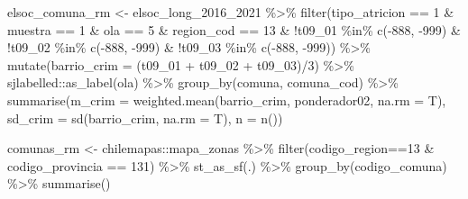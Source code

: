 \documentclass[
  12pt,
]{book}
\newenvironment{Shaded}{\begin{snugshade}}{\end{snugshade}}
\newcommand{\AttributeTok}[1]{\textcolor[rgb]{0.77,0.63,0.00}{#1}}
\newcommand{\DecValTok}[1]{\textcolor[rgb]{0.00,0.00,0.81}{#1}}
\newcommand{\FunctionTok}[1]{\textcolor[rgb]{0.00,0.00,0.00}{#1}}
\newcommand{\NormalTok}[1]{#1}
\newcommand{\OtherTok}[1]{\textcolor[rgb]{0.56,0.35,0.01}{#1}}
\newcommand{\SpecialCharTok}[1]{\textcolor[rgb]{0.00,0.00,0.00}{#1}}
\newcommand{\StringTok}[1]{\textcolor[rgb]{0.31,0.60,0.02}{#1}}
\begin{document}
\begin{Shaded}
\begin{Highlighting}[]
\NormalTok{elsoc\_comuna\_rm }\OtherTok{\textless{}{-}}\NormalTok{ elsoc\_long\_2016\_2021 }\SpecialCharTok{\%\textgreater{}\%} 
  \FunctionTok{filter}\NormalTok{(tipo\_atricion }\SpecialCharTok{==} \DecValTok{1} \SpecialCharTok{\&}\NormalTok{ muestra }\SpecialCharTok{==} \DecValTok{1} \SpecialCharTok{\&}\NormalTok{ ola }\SpecialCharTok{==} \DecValTok{5} \SpecialCharTok{\&}\NormalTok{ region\_cod }\SpecialCharTok{==} \DecValTok{13} \SpecialCharTok{\&} \SpecialCharTok{!}\NormalTok{t09\_01 }\SpecialCharTok{\%in\%} \FunctionTok{c}\NormalTok{(}\SpecialCharTok{{-}}\DecValTok{888}\NormalTok{, }\SpecialCharTok{{-}}\DecValTok{999}\NormalTok{) }\SpecialCharTok{\&}
           \SpecialCharTok{!}\NormalTok{t09\_02 }\SpecialCharTok{\%in\%} \FunctionTok{c}\NormalTok{(}\SpecialCharTok{{-}}\DecValTok{888}\NormalTok{, }\SpecialCharTok{{-}}\DecValTok{999}\NormalTok{) }\SpecialCharTok{\&} \SpecialCharTok{!}\NormalTok{t09\_03 }\SpecialCharTok{\%in\%} \FunctionTok{c}\NormalTok{(}\SpecialCharTok{{-}}\DecValTok{888}\NormalTok{, }\SpecialCharTok{{-}}\DecValTok{999}\NormalTok{)) }\SpecialCharTok{\%\textgreater{}\%} 
  \FunctionTok{mutate}\NormalTok{(}\AttributeTok{barrio\_crim =}\NormalTok{ (t09\_01 }\SpecialCharTok{+}\NormalTok{ t09\_02 }\SpecialCharTok{+}\NormalTok{ t09\_03)}\SpecialCharTok{/}\DecValTok{3}\NormalTok{) }\SpecialCharTok{\%\textgreater{}\%}
\NormalTok{  sjlabelled}\SpecialCharTok{::}\FunctionTok{as\_label}\NormalTok{(ola) }\SpecialCharTok{\%\textgreater{}\%} 
  \FunctionTok{group\_by}\NormalTok{(comuna, comuna\_cod) }\SpecialCharTok{\%\textgreater{}\%} 
  \FunctionTok{summarise}\NormalTok{(}\AttributeTok{m\_crim =} \FunctionTok{weighted.mean}\NormalTok{(barrio\_crim, ponderador02, }\AttributeTok{na.rm =}\NormalTok{ T),}
            \AttributeTok{sd\_crim =} \FunctionTok{sd}\NormalTok{(barrio\_crim, }\AttributeTok{na.rm =}\NormalTok{ T),}
            \AttributeTok{n =} \FunctionTok{n}\NormalTok{())}

\NormalTok{comunas\_rm }\OtherTok{\textless{}{-}}\NormalTok{ chilemapas}\SpecialCharTok{::}\NormalTok{mapa\_zonas }\SpecialCharTok{\%\textgreater{}\%} 
  \FunctionTok{filter}\NormalTok{(codigo\_region}\SpecialCharTok{==}\DecValTok{13} \SpecialCharTok{\&}\NormalTok{ codigo\_provincia }\SpecialCharTok{==} \StringTok{\textquotesingle{}131\textquotesingle{}}\NormalTok{) }\SpecialCharTok{\%\textgreater{}\%} 
  \FunctionTok{st\_as\_sf}\NormalTok{(.) }\SpecialCharTok{\%\textgreater{}\%} 
  \FunctionTok{group\_by}\NormalTok{(codigo\_comuna) }\SpecialCharTok{\%\textgreater{}\%} 
  \FunctionTok{summarise}\NormalTok{()}


\end{Highlighting}
\end{Shaded}
\end{document}
